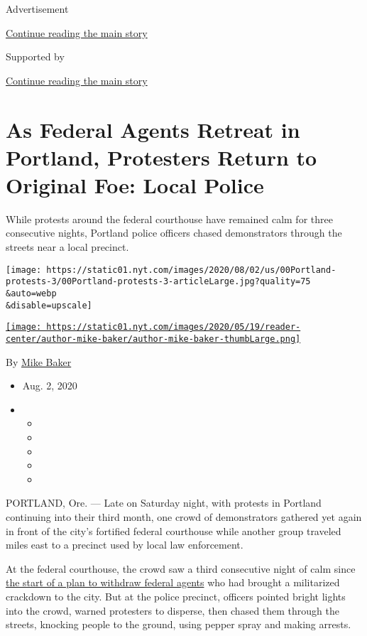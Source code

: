 Advertisement

\protect\hyperlink{after-top}{Continue reading the main story}

Supported by

\protect\hyperlink{after-sponsor}{Continue reading the main story}

\hypertarget{as-federal-agents-retreat-in-portland-protesters-return-to-original-foe-local-police}{%
\section{As Federal Agents Retreat in Portland, Protesters Return to
Original Foe: Local
Police}\label{as-federal-agents-retreat-in-portland-protesters-return-to-original-foe-local-police}}

While protests around the federal courthouse have remained calm for
three consecutive nights, Portland police officers chased demonstrators
through the streets near a local precinct.

\texttt{[image: https://static01.nyt.com/images/2020/08/02/us/00Portland-protests-3/00Portland-protests-3-articleLarge.jpg?quality=75\\\&auto=webp\\\&disable=upscale]}

\href{https://www.nytimes.com/by/mike-baker}{\texttt{[image: https://static01.nyt.com/images/2020/05/19/reader-center/author-mike-baker/author-mike-baker-thumbLarge.png]}}

By \href{https://www.nytimes.com/by/mike-baker}{Mike Baker}

\begin{itemize}
\item
  Aug. 2, 2020
\item
  \begin{itemize}
  \item
  \item
  \item
  \item
  \item
  \end{itemize}
\end{itemize}

PORTLAND, Ore. --- Late on Saturday night, with protests in Portland
continuing into their third month, one crowd of demonstrators gathered
yet again in front of the city's fortified federal courthouse while
another group traveled miles east to a precinct used by local law
enforcement.

At the federal courthouse, the crowd saw a third consecutive night of
calm since
\href{https://www.nytimes.com/2020/07/29/us/protests-portland-federal-withdrawal.html}{the
start of a plan to withdraw federal agents} who had brought a
militarized crackdown to the city. But at the police precinct, officers
pointed bright lights into the crowd, warned protesters to disperse,
then chased them through the streets, knocking people to the ground,
using pepper spray and making arrests.

